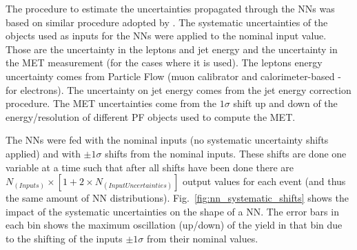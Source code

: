 The procedure to estimate the uncertainties propagated through the NNs was based on similar procedure adopted by \cite{bib:CMS-AN-12-141, bib:CMS-PAS-HIG-16-022, bib:ATLAS-CONF-2017-041}. The systematic uncertainties of the objects used as inputs for the NNs were applied to the nominal input value. Those are the uncertainty in the leptons and jet energy and the uncertainty in the MET measurement (for the cases where it is used). The leptons energy uncertainty comes from Particle Flow (muon calibrator and calorimeter-based - for electrons). The uncertainty on jet energy comes from the jet energy correction procedure. The MET uncertainties come from the $1\sigma$ shift up and down of the energy/resolution of different PF objects used to compute the MET.

The NNs were fed with the nominal inputs (no systematic uncertainty shifts applied) and with $\pm 1 \sigma$ shifts from the nominal inputs. These shifts are done one variable at a time such that after all shifts have been done there are $N_{(Inputs)} \times [1+2 \times N_{(InputUncertainties)}]$ output values for each event (and thus the same amount of NN distributions). Fig.~\ref{fig:nn_systematic_shifts} shows the impact of the systematic uncertainties on the shape of a NN. The error bars in each bin shows the maximum oscillation (up/down) of the yield in that bin due to the shifting of the inputs $\pm 1 \sigma$ from their nominal values. %

